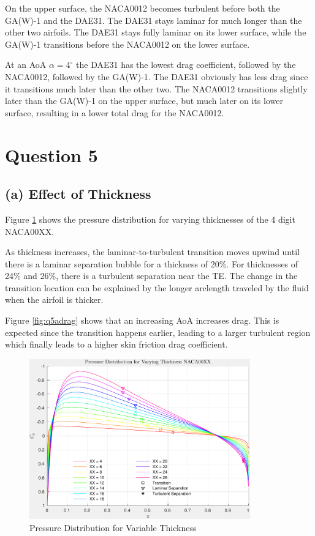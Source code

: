 \documentclass[letterpaper,12pt,]{article}
\begin{document}
On the upper surface, the NACA0012 becomes turbulent before both the GA(W)-1 and the DAE31. The DAE31 stays laminar for much longer than the other two airfoils. The DAE31 stays fully laminar on its lower surface, while the GA(W)-1 transitions before the NACA0012 on the lower surface.

At an AoA $\alpha = 4^\circ$ the DAE31 has the lowest drag coefficient, followed by the NACA0012, followed by the GA(W)-1.
The DAE31 obviously has less drag since it transitions much later than the other two.
The NACA0012 transitions slightly later than the GA(W)-1 on the upper surface, but much later on its lower surface, resulting in a lower total drag for the NACA0012.


\section*{Question 5}
\subsection*{(a) Effect of Thickness}

Figure \ref{fig:q5apressure} shows the pressure distribution for varying thicknesses of the 4 digit NACA00XX.

As thickness increases, the laminar-to-turbulent transition moves upwind until there is a laminar separation bubble for a thickness of 20\%.
For thicknesses of 24\% and 26\%, there is a turbulent separation near the TE.
The change in the transition location can be explained by the longer arclength traveled by the fluid when the airfoil is thicker.

Figure \ref{fig:q5adrag} shows that an increasing AoA increases drag. This is expected since the transition happens earlier, leading to a larger turbulent region which finally leads to a higher skin friction drag coefficient.

\begin{figure}[!h]
    \centering
    \includegraphics[width = 0.85\textwidth]{./figures/q5apressure.pdf}
    \caption{Pressure Distribution for Variable Thickness}
    \label{fig:q5apressure}
\end{figure}
\end{document}
